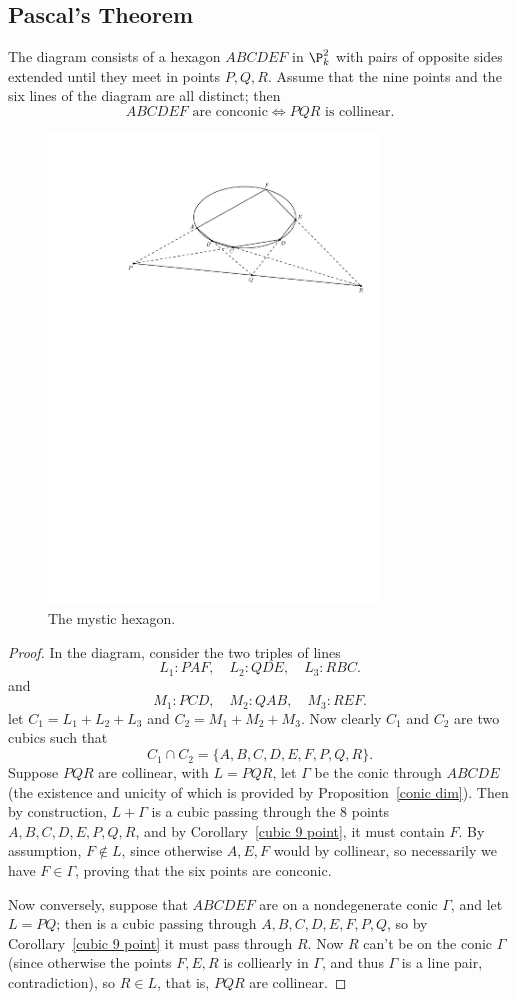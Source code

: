 \subsection{Pascal's Theorem}
\begin{proposition}
The diagram consists of a hexagon $ABCDEF$ in $\P^2_k$ with pairs of opposite sides extended until they meet in points $P,Q,R$. Assume that the nine points and the six lines of the diagram are all distinct; then
\[\text{$ABCDEF$ are conconic}\iff\text{$PQR$ is collinear}.\]
\end{proposition}
\begin{figure}[htbp]
\centering
\includegraphics[width=250pt]{pictures/pascal-thm}
\caption{The mystic hexagon.}
\end{figure}
\begin{proof}
In the diagram, consider the two triples of lines
\[L_1:PAF,\quad L_2:QDE,\quad L_3:RBC.\]
and 
\[M_1:PCD,\quad M_2:QAB,\quad M_3:REF.\]
let $C_1=L_1+L_2+L_3$ and $C_2=M_1+M_2+M_3$. Now clearly $C_1$ and $C_2$ are two cubics such that
\[C_1\cap C_2=\{A,B,C,D,E,F,P,Q,R\}.\]
Suppose $PQR$ are collinear, with $L=PQR$, let $\Gamma$ be the conic through $ABCDE$ (the existence and unicity of which is provided by Proposition~\ref{conic dim}). Then by construction, $L+\Gamma$ is a cubic passing through the $8$ points $A,B,C,D,E,P,Q,R$, and by Corollary~\ref{cubic 9 point}, it must contain $F$. By assumption, $F\notin L$, since otherwise $A,E,F$ would by collinear, so necessarily we have $F\in\Gamma$, proving that the six points are conconic.\par
Now conversely, suppose that $ABCDEF$ are on a nondegenerate conic $\Gamma$, and let $L=PQ$; then is a cubic passing through $A,B,C,D,E,F,P,Q$, so by Corollary~\ref{cubic 9 point} it must pass through $R$. Now $R$ can't be on the conic $\Gamma$ (since otherwise the points $F,E,R$ is colliearly in $\Gamma$, and thus $\Gamma$ is a line pair, contradiction), so $R\in L$, that is, $PQR$ are collinear.
\end{proof}
